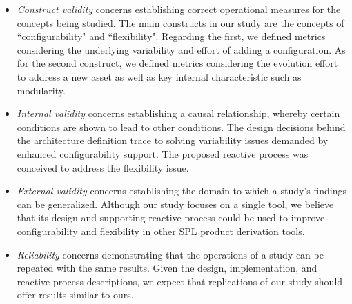 \begin{itemize}

\item \emph{Construct validity} concerns establishing correct operational measures for the concepts being studied. The main constructs in our study are the concepts of ``configurability" and ``flexibility". Regarding the first, we defined metrics considering the underlying variability and effort of adding a configuration. As for the second construct, we defined metrics considering the evolution effort to address a new asset as well as key internal characteristic such as modularity.

\item \emph{Internal validity} concerns establishing a causal relationship, whereby certain conditions are shown to lead to other conditions. The design decisions behind the architecture definition trace to solving variability issues demanded by enhanced configurability support. The proposed reactive process was conceived to address the flexibility issue.

\item \emph{External validity} concerns establishing the domain to which a study's findings can be generalized. Although our study focuses on a single tool,  we believe that its design and supporting reactive process could be used to improve configurability and flexibility in other SPL product derivation tools.

\item \emph{Reliability} concerns demonstrating that the operations of a study can be repeated with the same results. Given the design, implementation, and reactive process descriptions, we expect that replications of our study should offer results similar to ours.

\end{itemize}



